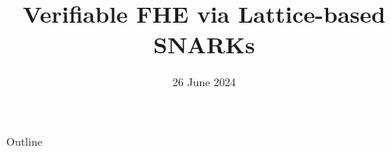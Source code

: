 \documentclass{beamer}
\title{Verifiable FHE via Lattice-based SNARKs}
\date{26 June 2024}
\begin{document}
	\begin{frame}
		\titlepage
	\end{frame}
	
	\begin{frame}{Outline}
		\tableofcontents
	\end{frame}
	
	
	
\end{document}
